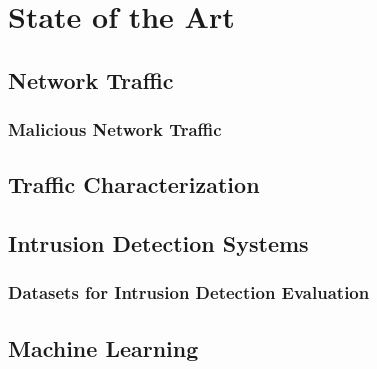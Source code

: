 \chapter{State of the Art}

\lipsum[3]

\section{Network Traffic}
\label{sec:network-traffic}

\lipsum

\subsection{Malicious Network Traffic}
\label{subsec:malicious-traffic}

\lipsum \cite{icissp18} \cite{Khraisat2019} \cite{Leevy2020}

\section{Traffic Characterization}
\label{sec:traffic-characterization}

\lipsum

\section{Intrusion Detection Systems}
\label{sec:intrusion-detection-system}

\lipsum

\subsection{Datasets for Intrusion Detection Evaluation}
\label{subsec:datasets-for-evaluation}

\lipsum

\section{Machine Learning}
\label{sec:machine-learning}

\lipsum